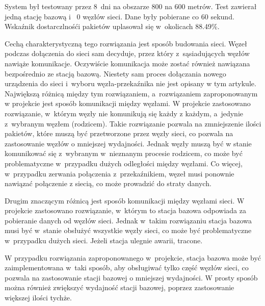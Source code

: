 System był testowany przez 8~dni na obszarze 800 na 600 metrów.
Test zawierał jedną stację bazową i ~0 węzłów sieci.
Dane były pobierane co 60 sekund.
Wskaźnik dostarczlnośći pakietów uplasował się w~okolicach 88.49\%.

Cechą charakterystyczną tego rozwiązania jest sposób budowania sieci.
Węzeł podczas dołączenia do sieci sam decyduje, przez który z~sąsiadujących węzłów nawiąże komunikacje.
Oczywiście komunikacja może zostać również nawiązana bezpośrednio ze stacją bazową.
Niestety sam proces dołączania nowego urządzenia do sieci i~wyboru węzła-przekaźnika nie jest opisany w tym artykule.
Największą różnicą między tym rozwiązaniem, a~rozwiązaniem zaproponowanym w projekcie jest sposób komunikacji między węzłami.
W projekcie zastosowano rozwiązanie, w~którym węzły nie komunikują się każdy z każdym, a~jedynie z~wybranym węzłem (rodzicem).
Takie rozwiązanie pozwala na zmniejszenie ilości pakietów, które muszą być przetworzone przez węzły sieci, co pozwala na zastosowanie węzłów o mniejszej wydajności.
Jednak węzły muszą być w stanie komunikować się z~wybranym w~nieznanym procesie rodzicem, co może być problematyczne w~przypadku dużych odległości między węzłami.
Co więcej, w~przypadku zerwania połączenia z~przekaźnikiem, węzeł musi ponownie nawiązać połączenie z siecią, co może prowadzić do straty danych.

Drugim znaczącym różnicą jest sposób komunikacji między węzłami sieci.
W projekcie zastosowano rozwiązanie, w~którym to stacja bazowa odpowiada za pobieranie danych od węzłów sieci.
Jednak w~takim rozwiązaniu stacja bazowa musi być w~stanie obsłużyć wszystkie węzły sieci, co może być problematyczne w~przypadku dużych sieci.
Jeżeli stacja ulegnie awarii, tracone.

W przypadku rozwiązania zaproponowanego w~projekcie, stacja bazowa może być zaimplementowana w~taki sposób, aby obsługiwać tylko część węzłów sieci, co pozwala na zastosowanie stacji bazowej o mniejszej wydajności.
W prosty sposób można również zwiększyć wydajność stacji bazowej, poprzez zastosowanie większej ilości tychże.

